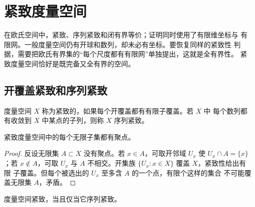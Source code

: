 \chapter{紧致度量空间}
\label{chap:compact-metric-spaces}

在欧氏空间中，紧致、序列紧致和闭有界等价；证明同时使用了有限维坐标与
有限网。一般度量空间仍有开球和数列，却未必有坐标。要恢复同样的紧致性
判据，需要把欧氏有界集的“每个尺度都有有限网”单独提出，这就是全有界性。
紧致度量空间恰好是既完备又全有界的空间。

\section{开覆盖紧致和序列紧致}

\begin{definition}[紧致与序列紧致]
度量空间 \(X\) 称为紧致的，如果每个开覆盖都有有限子覆盖。若 \(X\) 中
每个数列都有收敛到 \(X\) 中某点的子列，则称 \(X\) 序列紧致。
\end{definition}

\begin{lemma}[紧致空间中的无限集]
\label{lem:compact-metric-infinite-set-cluster}
紧致度量空间中的每个无限子集都有聚点。
\end{lemma}

\begin{proof}
反设无限集 \(A\subset X\) 没有聚点。若 \(x\in A\)，可取开邻域
\(U_x\) 使 \(U_x\cap A=\{x\}\)；若 \(x\notin A\)，可取 \(U_x\) 与
\(A\) 不相交。开集族 \(\{U_x:x\in X\}\) 覆盖 \(X\)，紧致性给出有限
子覆盖。但每个被选出的 \(U_x\) 至多含 \(A\) 的一个点，有限个这样的集合
不可能覆盖无限集 \(A\)，矛盾。
\end{proof}

\begin{theorem}[度量空间中两种紧致性的等价]
\label{thm:metric-compact-sequential-equivalence}
度量空间紧致，当且仅当它序列紧致。
\end{theorem}

